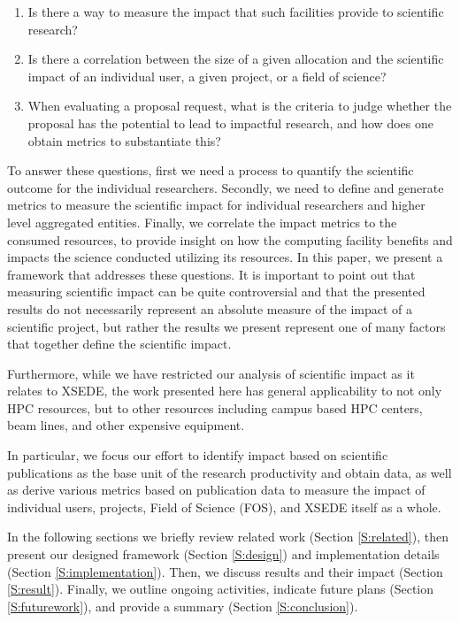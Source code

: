 \documentclass{sig-alternate}
\begin{document}
\begin{enumerate}

\item Is there a way to measure the impact that such facilities
  provide to scientific research?

\item Is there a correlation between the size of a given allocation
  and the scientific impact of an individual user, a given project, or
  a field of science?

\item When evaluating a proposal request, what is the criteria to
  judge whether the proposal has the potential to lead to impactful
  research, and how does one obtain metrics to substantiate this?

\end{enumerate} 

To answer these questions, first we need a process to quantify the
scientific outcome for the individual researchers. Secondly, we need
to define and generate metrics to measure the scientific impact for
individual researchers and higher level aggregated entities. Finally,
we correlate the impact metrics to the consumed resources, to provide
insight on how the computing facility benefits and impacts the science
conducted utilizing its resources. In this paper, we present a
framework that addresses these questions. It is important to point out
that measuring scientific impact can be quite controversial and that
the presented results do not necessarily represent an absolute measure
of the impact of a scientific project, but rather the results we
present represent one of many factors that together define the
scientific impact.

Furthermore, while we have restricted our analysis of scientific
impact as it relates to XSEDE, the work presented here has general
applicability to not only HPC resources, but to other resources
including campus based HPC centers, beam lines, and other expensive
equipment.

In particular, we focus our effort to identify impact based on
scientific publications as the base unit of the research productivity
and obtain data, as well as derive various metrics based on
publication data to measure the impact of individual users, projects,
Field of Science (FOS), and XSEDE itself as a whole.

In the following sections we briefly review related work (Section
\ref{S:related}), then present our designed framework (Section
\ref{S:design}) and implementation details (Section
\ref{S:implementation}). Then, we discuss results and their impact
(Section \ref{S:result}). Finally, we outline ongoing activities,
indicate future plans (Section \ref{S:futurework}), and provide a
summary (Section \ref{S:conclusion}).
\end{document}
